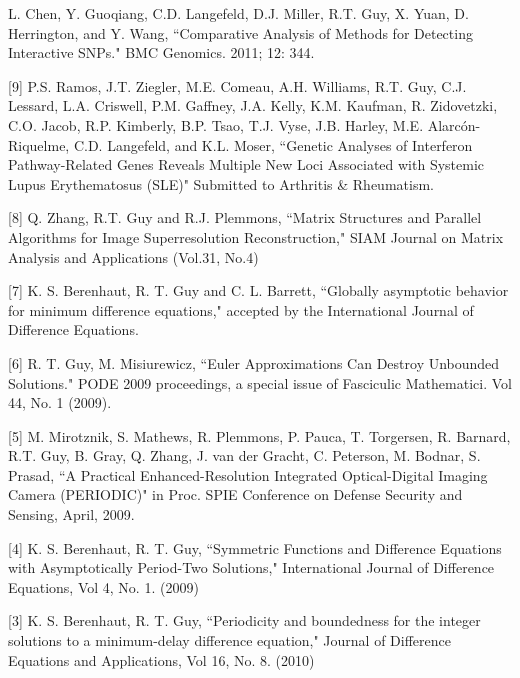\documentclass[overlapped,line,letterpaper]{res}
\begin{document}
\begin{resume}
[10] L. Chen, Y. Guoqiang, C.D. Langefeld, D.J. Miller, R.T. Guy, X. Yuan, D. Herrington, and Y. Wang, ``Comparative Analysis of Methods for Detecting Interactive SNPs." BMC Genomics. 2011; 12: 344. 

[9] P.S. Ramos, J.T. Ziegler, M.E. Comeau, A.H. Williams, R.T. Guy, C.J. Lessard, L.A. Criswell, P.M. Gaffney, J.A. Kelly, K.M. Kaufman, R. Zidovetzki, C.O. Jacob, R.P. Kimberly, B.P. Tsao, T.J. Vyse, J.B. Harley, M.E. Alarc\'{o}n-Riquelme, C.D. Langefeld, and K.L. Moser, ``Genetic Analyses of Interferon Pathway-Related Genes Reveals Multiple New Loci Associated with Systemic Lupus Erythematosus (SLE)"  Submitted to Arthritis \& Rheumatism.



[8] Q. Zhang, R.T. Guy and R.J. Plemmons, ``Matrix Structures and Parallel Algorithms for Image Superresolution Reconstruction," SIAM Journal on Matrix Analysis and Applications (Vol.31, No.4)

[7] K. S. Berenhaut, R. T. Guy and C. L. Barrett, ``Globally asymptotic behavior for minimum difference equations," accepted by the International Journal of Difference Equations.

[6] R. T. Guy, M. Misiurewicz, ``Euler Approximations Can Destroy Unbounded Solutions." PODE 2009 proceedings, a special issue of Fasciculic Mathematici.  Vol 44, No. 1 (2009).

[5] M. Mirotznik, S. Mathews, R. Plemmons, P. Pauca, T. Torgersen, R. Barnard, R.T. Guy, B. Gray, Q. Zhang, J. van der Gracht, C. Peterson, M. Bodnar, S. Prasad, ``A Practical Enhanced-Resolution Integrated Optical-Digital Imaging Camera (PERIODIC)" in Proc. SPIE Conference on Defense Security and Sensing, April, 2009.

[4] K. S. Berenhaut, R. T. Guy, ``Symmetric Functions and Difference Equations with Asymptotically Period-Two Solutions," International Journal of Difference Equations, Vol 4, No. 1. (2009)

[3] K. S. Berenhaut, R. T. Guy, ``Periodicity and boundedness for the integer solutions to a minimum-delay
difference equation," Journal of Difference Equations and Applications, Vol 16, No. 8.  (2010)


\end{resume}
\end{document}
